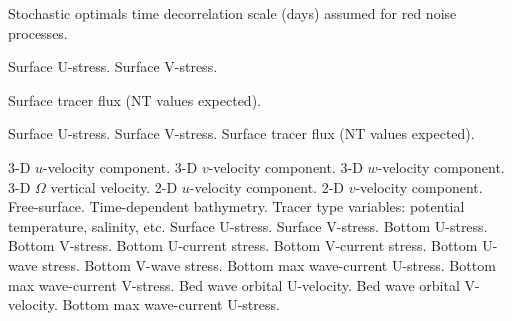 \begin{klist}
\begin{klist}
         Stochastic optimals time decorrelation
       scale (days) assumed for red noise processes.
     \end{klist}
     \begin{klist}
         Surface U-stress.
         Surface V-stress.
     \end{klist}
     \begin{klist}
        Surface tracer flux (NT values expected).
     \end{klist}
     \begin{klist}
        Surface U-stress.
        Surface V-stress.
        Surface tracer flux (NT values
       expected).
     \end{klist}
     \begin{klist}
           3-D $u$-velocity component.
           3-D $v$-velocity component.
           3-D $w$-velocity component.
           3-D $\Omega$ vertical velocity.
         2-D $u$-velocity component.
         2-D $v$-velocity component.
            Free-surface.
            Time-dependent bathymetry.
\vspace{2 mm}
            Tracer type variables: potential
    temperature, salinity, etc.
\vspace{2 mm}
          Surface U-stress.
          Surface V-stress.
          Bottom U-stress.
          Bottom V-stress.
\vspace{2 mm}
          Bottom U-current stress.
          Bottom V-current stress.
          Bottom U-wave stress.
          Bottom V-wave stress.
          Bottom max wave-current U-stress.
          Bottom max wave-current V-stress.
\vspace{2 mm}
          Bed wave orbital U-velocity.
          Bed wave orbital V-velocity.
          Bottom max wave-current U-stress.

\end{klist}
\end{klist}
